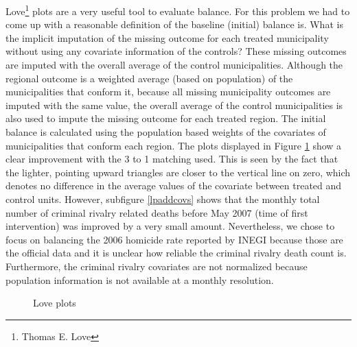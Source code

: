 \documentclass{article}[11 pt]
\begin{document}
Love\footnote{Thomas E. Love} plots are a very useful tool to evaluate balance. For this problem we had to come up with a reasonable definition of the baseline (initial) balance is. What is the implicit imputation of the missing outcome for each treated municipality without using any covariate information of the controls? These missing outcomes are imputed with the overall average of the control municipalities. Although the regional outcome is a weighted average (based on population) of the municipalities that conform it, because all missing municipality outcomes are imputed with the same value, the overall average of the control municipalities is also used to impute the missing outcome for each treated region. The initial balance is calculated using the population based weights of the covariates of municipalities that conform each region. The plots displayed in Figure \ref{lpme} show a clear improvement with the 3 to 1 matching used. This is seen by the fact that the lighter, pointing upward triangles are closer to the vertical line on zero, which denotes no difference in the average values of the covariate between treated and control units. However, subfigure \ref{lpaddcovs} shows that the monthly total number of criminal rivalry related deaths before May 2007 (time of first intervention) was improved by a very small amount. Nevertheless, we chose to focus on balancing the 2006 homicide rate reported by INEGI because those are the official data and it is unclear how reliable the criminal rivalry death count is. Furthermore, the criminal rivalry covariates are not normalized because population information is not available at a monthly resolution.

\begin{figure}[htdp]
	\centering
		\caption{Love plots}
		\label{lpme}
\end{figure}
\end{document}

